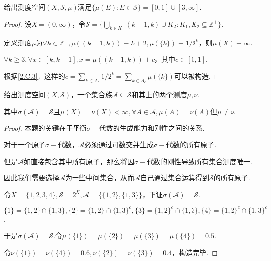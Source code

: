 \begin{problem}[7]\label{2.C.7}
    给出测度空间\((X, \mathcal{S}, \mu)\)满足\(\{\mu(E): E \in \mathcal{S}\}=[0,1] \cup [3,\infty]\).
\end{problem}

\begin{proof}
    设\(X=(0, \infty)\)，令\(\mathcal{S}=\{\bigcup_{k \in K_1} (k-1,k) \cup K_2: K_1, K_2 \subseteq \mathbb{Z}^+\}\).

    定义测度\(\mu\)为\(\forall k \in \mathbb{Z}^+, \mu((k-1,k))=k+2, \mu(\{k\})=1/2^k\)，则\(\mu(X)=\infty\).

    \(\forall k \geq 3, \forall x \in [k,k+1], x=\mu((k-1,k))+c\)，其中\(c \in [0,1]\).

    {\kaishu 根据\cref{2.C.3}，这样的\(c=\sum_{k \in A_c} 1/2^k=\sum_{k \in A_c} \mu(\{k\})\)可以被构造}.
\end{proof}

\begin{problem}[8]\label{2.C.8}
    给出测度空间\((X, \mathcal{S})\)，一个集合族\(\mathcal{A} \subseteq \mathcal{S}\)和其上的两个测度\(\mu, \nu\).

    其中\(\sigma(\mathcal{A})=\mathcal{S}\)且\(\mu(X)=\nu(X)<\infty, \forall A \in \mathcal{A}, \mu(A)=\nu(A)\)但\(\mu \ne \nu\).
\end{problem}

\begin{proof}
    {\kaishu 本题的关键在于平衡\(\sigma-\)代数的生成能力和刚性之间的关系.
    
    对于一个原子\(\sigma-\)代数，\(\mathcal{A}\)必须通过可数交并生成\(\sigma-\)代数的所有原子.
    
    但是\(\mathcal{A}\)如直接包含其中所有原子，那么将因\(\sigma-\)代数的刚性导致所有集合测度唯一.
    
    因此我们需要选择\(\mathcal{A}\)为一些中间集合，从而\(\mathcal{A}\)自己通过集合运算得到\(\mathcal{S}\)的所有原子.}

    令\(X=\{1,2,3,4\}, \mathcal{S}=2^X, \mathcal{A}=\{\{1,2\}, \{1,3\}\}\)，下证\(\sigma(\mathcal{A})=\mathcal{S}\).

    \(\{1\}=\{1,2\} \cap \{1,3\}, \{2\}=\{1,2\} \cap \{1,3\}^c, \{3\}=\{1,2\}^c \cap \{1,3\}, \{4\}=\{1,2\}^c \cap \{1,3\}^c\).

    于是\(\sigma(\mathcal{A})=\mathcal{S}\).令\(\mu(\{1\})=\mu(\{2\})=\mu(\{3\})=\mu(\{4\})=0.5\).

    令\(\nu(\{1\})=\nu(\{4\})=0.6, \nu(\{2\})=\nu(\{3\})=0.4\)，构造完毕.
\end{proof}

